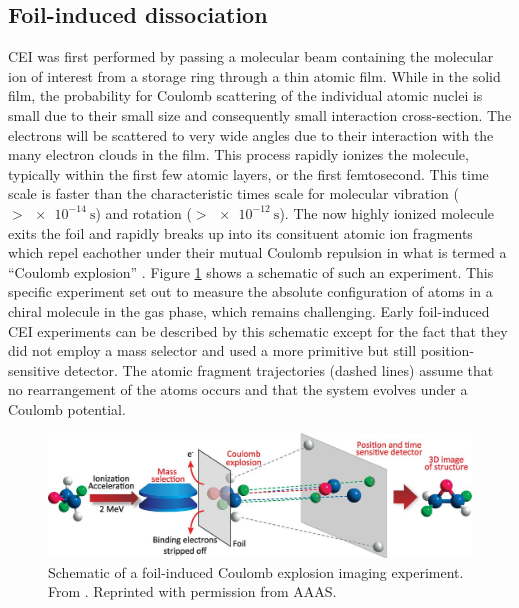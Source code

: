\subsection{Foil-induced dissociation}
CEI was first performed by passing a molecular beam containing the molecular ion of interest from a storage ring through a thin atomic film. While in the solid film, the probability for Coulomb scattering of the individual atomic nuclei is small due to their small size and consequently small interaction cross-section. The electrons will be scattered to very wide angles due to their interaction with the many electron clouds in the film. This process rapidly ionizes the molecule, typically within the first few atomic layers, or the first femtosecond. This time scale is faster than the characteristic times scale for molecular vibration ($>\SI{e-14}{\s}$) and rotation ($>\SI{e-12}{\s}$). The now highly ionized molecule exits the foil and rapidly breaks up into its consituent atomic ion fragments which repel eachother under their mutual Coulomb repulsion in what is termed a ``Coulomb explosion'' \citep{Vager89}. Figure \ref{fig:foilExperiment} shows a schematic of such an experiment. This specific experiment set out to measure the absolute configuration of atoms in a chiral molecule in the gas phase, which remains challenging. Early foil-induced CEI experiments can be described by this schematic except for the fact that they did not employ a mass selector and used a more primitive but still position-sensitive detector.  The atomic fragment trajectories (dashed lines) assume that no rearrangement of the atoms occurs and that the system evolves under a Coulomb potential.

\begin{figure}
  \centering
  \includegraphics[width=\textwidth]{gfx/FoilExperiment}
  \caption[Schematic of a foil-induced Coulomb explosion imaging experiment.]
  {Schematic of a foil-induced Coulomb explosion imaging experiment. From \citet{Herwig13}. Reprinted with permission from AAAS.}
  \label{fig:foilExperiment}
\end{figure}

